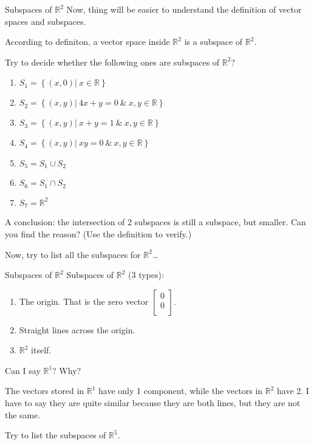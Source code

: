 \documentclass{beamer}
\begin{document}
\begin{frame}{Subspaces of $\mathbb{R} ^2$}
Now, thing will be easier to understand the definition of vector spaces and subspaces.

\vspace{3pt}
According to definiton, a vector space inside $\mathbb{R} ^2$ is a subspace of $\mathbb{R} ^2$.

\vspace{3pt}
Try to decide whether the following ones are subspaces of $\mathbb{R} ^2$?

\begin{enumerate}
    \item $S_1=\left\{ \left( x,0 \right) |\: x\in \mathbb{R} \right\}$
    \item $S_2=\left\{ \left( x,y \right) |\: 4x+y=0 \:\&\: x,y\in \mathbb{R} \right\}$
    \item $S_3=\left\{ \left( x,y \right) |\: x+y=1 \:\&\: x,y\in \mathbb{R} \right\}$
    \item $S_4=\left\{ \left( x,y \right) |\: xy=0 \:\&\: x,y\in \mathbb{R} \right\}$\
    \item $S_5=S_1\cup S_2$
    \item $S_6=S_1\cap S_2$
    \item $S_7=\mathbb{R} ^2$
\end{enumerate}

\vspace{3pt}
A conclusion: the intersection of 2 subspaces is still a subspace, but smaller. Can you find the reason? (Use the definition to verify.)

\vspace{3pt}
Now, try to list all the subspaces for $\mathbb{R} ^2$\dots
\end{frame}

\begin{frame}{Subspaces of $\mathbb{R} ^2$}
Subspaces of $\mathbb{R} ^2$ (3 types):
\begin{enumerate}
    \item The origin. That is the zero vector $\left[ \begin{array}{c}
        0\\
        0\\
    \end{array} \right] $.
    \item Straight lines across the origin.
    \vspace{7pt}
    \item  $\mathbb{R} ^2$ itself.
\end{enumerate}

\vspace{5pt}
Can I say $\mathbb{R} ^1$? Why?

\vspace{3pt}
The vectors stored in $\mathbb{R} ^1$ have only 1 component, while the vectors in $\mathbb{R} ^2$ have 2. I have to say they are quite similar because they are both lines, but they are not the same.

\vspace{3pt}
Try to list the subspaces of $\mathbb{R} ^5$.
\end{frame}
\end{document}
